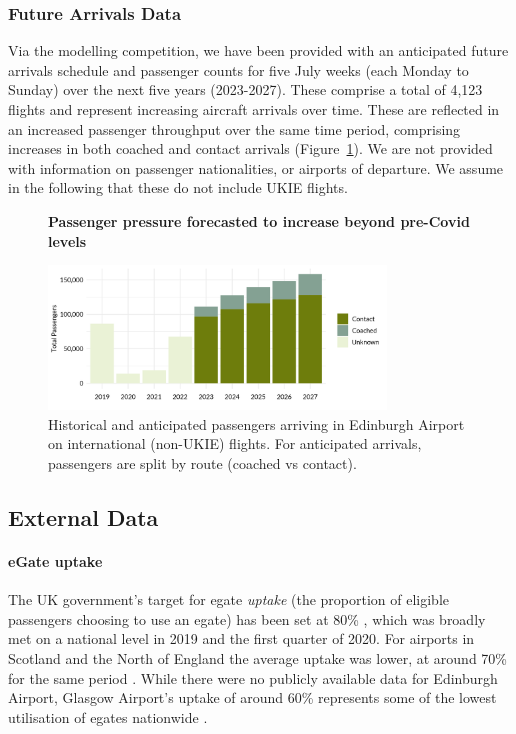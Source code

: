 \documentclass[10pt]{article}
\newcommand*{\figuretitle}[1]{%
    {\centering%
    \textbf{#1}%
    \par\medskip}%
}
\begin{document}
\subsubsection{Future Arrivals Data} \label{sec:future_arrivals_data}
Via the modelling competition, we have been provided with an anticipated future arrivals schedule and passenger counts for five July weeks (each Monday to Sunday) over the next five years (2023-2027). These comprise a total of 4,123 flights and represent increasing aircraft arrivals over time. These are reflected in an increased passenger throughput over the same time period, comprising increases in both coached and contact arrivals (Figure~\ref{fig:future_passenger_burden}). We are not provided with information on passenger nationalities, or airports of departure. We assume in the following that these do not include UKIE flights. 

% 


\begin{figure}[!ht]
    \centering
    \figuretitle{Passenger pressure forecasted to increase beyond pre-Covid levels}
    \includegraphics[width=0.8\textwidth]{figures/future_passenger_burden_fig.png}
     \caption{
     Historical and anticipated passengers arriving in Edinburgh Airport on international (non-UKIE) flights. For anticipated arrivals, passengers are split by route (coached vs contact).} \label{fig:future_passenger_burden}
\end{figure}

\subsection{External Data} \label{sec:observed_arrivals_data}

\paragraph{eGate uptake} 
The UK government's target for \gls{egate} \textit{uptake} (the proportion of eligible passengers choosing to use an \gls{egate}) has been set at 80\% \cite{UK_border_2025}, which was broadly met on a national level in 2019 and the first quarter of 2020. For airports in Scotland and the North of England the average uptake was lower, at around 70\% for the same period \cite{Inspection_eGates}. While there were no publicly available data for Edinburgh Airport, Glasgow Airport's uptake of around 60\% represents some of the lowest utilisation of \glspl{egate} nationwide \cite{Inspection_eGates}.
\end{document}
